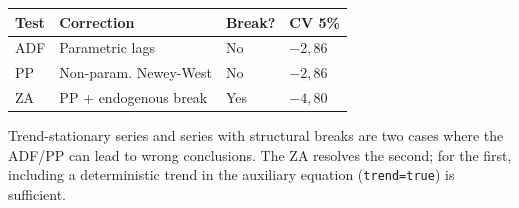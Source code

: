 \begin{center}
\begin{tabular}{llll}
\toprule
\textbf{Test} & \textbf{Correction} & \textbf{Break?} & \textbf{CV 5\%} \\
\midrule
ADF      & Parametric lags       & No  & $-2{,}86$ \\
PP       & Non-param. Newey-West & No  & $-2{,}86$ \\
ZA       & PP + endogenous break & Yes & $-4{,}80$ \\
\bottomrule
\end{tabular}
\end{center}

\begin{nota}
  Trend-stationary series and series with structural breaks are two cases where
  the ADF/PP can lead to wrong conclusions. The ZA resolves the second; for the
  first, including a deterministic trend in the auxiliary equation
  (\texttt{trend=true}) is sufficient.
\end{nota}
